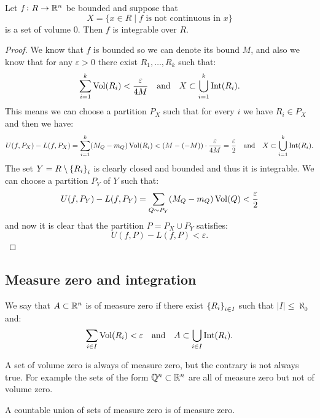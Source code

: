 \documentclass[11pt,a4paper]{article}
\begin{document}
\begin{theorem}
  Let $f \colon R \to \mathbb{R}^n$ be bounded and suppose that
  \[
    X = \{x \in R \mid \text{$f$ is not continuous in $x$}\}
  \]
  is a set of volume $0$. Then $f$ is integrable over $R$.
\end{theorem}
\begin{proof}
  We know that $f$ is bounded so we can denote its bound $M$,
  and also we know that for any $\varepsilon > 0 $ there exist
  $R_1,\dots,R_k$ such that:
  \begin{align*}
    \sum_{i=1}^{k} \operatorname{Vol}(R_i) < \frac{\varepsilon}{4 M}
    \quad \text{and} \quad
    X \subset \bigcup_{i=1}^{k} \operatorname{Int}(R_i).
  \end{align*}
  This means we can choose a partition $P_X$ such that for every $i$
  we have $R_i \in P_X$ and then we have:
  \[
    U(f,P_X) - L(f,P_X) = 
    \sum_{i=1}^{k} (M_Q - m_Q) \operatorname{Vol}(R_i) <
    (M - (-M)) \cdot \frac{\varepsilon}{4 M} = \frac{\varepsilon}{2}
    \quad \text{and} \quad
    X \subset \bigcup_{i=1}^{k}{\operatorname{Int}(R_i)}.
  \]
  The set $Y = R \setminus \left\{R_i\right\}_i$ is clearly closed and bounded
  and thus it is integrable.
  We can choose a partition $P_Y$ of $Y$ such that:
  \[
    U(f,P_Y) - L(f,P_Y) = 
    \sum_{Q \sim P_Y} (M_Q - m_Q) \operatorname{Vol}(Q) < 
    \frac{\varepsilon}{2}
  \]
  and now it is clear that the partition $P = P_X \cup P_Y$
  satisfies:
  \[
    U(f,P) - L(f,P) < \varepsilon.
  \]
\end{proof}

\subsection{Measure zero and integration}

\begin{definition}
  We say that $A \subset \mathbb{R}^n$ is of measure zero if
  there exist $\left\{R_i\right\}_{i \in I}$ such that $|I| \le \aleph_0$ and:
  \[
    \sum_{i \in I} \operatorname{Vol}(R_i) < \varepsilon
    \quad \text{and} \quad
    A \subset \bigcup_{i \in I} \operatorname{Int}(R_i).
  \]
\end{definition}
\begin{remark}
  A set of volume zero is always of measure zero, but the
  contrary is not always true. For example the sets of the
  form $\mathbb{Q}^n \subset \mathbb{R}^n$ are all of measure zero but not
  of volume zero.
\end{remark}

\begin{remark}
  A countable union of sets of measure zero is of measure zero.
\end{remark}
\end{document}
